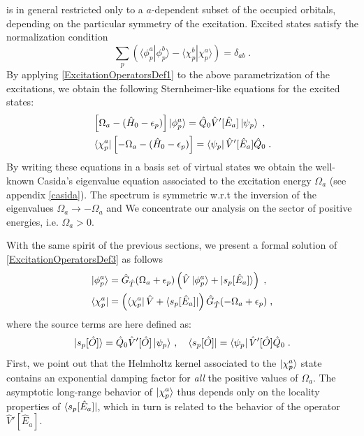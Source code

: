 \documentclass[reprint,aps,prb]{revtex4-1}
\newcommand{\eps}{\epsilon}
\newcommand{\be}{\begin{equation}}
\newcommand{\ee}{\end{equation}}
\newcommand{\nn}{\notag}
\newcommand{\lb}{\label}
\newcommand{\op}[1]{\hat {#1}}
\newcommand{\brket}[2]{\langle  #1 | #2 \rangle} %
\newcommand{\hnot}{\op{H}_0}
\newcommand{\GH}{\op G_{\op T}}
\begin{document}
is in general restricted only to a $a$-dependent subset of the occupied orbitals, depending on the particular symmetry
of the excitation.
Excited states  satisfy the normalization condition
\be\lb{ExcitedStateOrthNormDef1}
\sum_p \left(\brket{\phi_p^a}{\phi_p^b} - \brket{\chi_p^b}{\chi_p^a}\right) = \delta_{ab} \;.
\ee
By applying \eqref{ExcitationOperatorsDef1} to the above parametrization
of the excitations, we obtain the following Sternheimer-like equations for the excited states:
\begin{align}\lb{ExcitationOperatorsDef3}
&\left[\Omega_a-(\hnot - \eps_p)\right] \ket{\phi_p^a} = \op Q_0 \op V'[\op E_a] \ket{\psi_p} \;, \nn\\
&\bra{\chi_p^a}\left[-\Omega_a-(\hnot - \eps_p)\right] = \bra{\psi_p} \op V'[\op E_a] \op Q_0  \;.
\end{align}
By writing these equations in a basis set of virtual states we obtain the well-known Casida's eigenvalue equation\cite{CasidaBook}
associated to the excitation energy $\Omega_a$ (see appendix \ref{casida}).
The spectrum is symmetric w.r.t the inversion of the eigenvalues
$\Omega_a \rightarrow -\Omega_a$ and 
We concentrate our analysis on the sector of positive energies, i.e. $\Omega_a > 0$.

With the same spirit of the previous sections, we present a formal solution of \eqref{ExcitationOperatorsDef3} as follows
\begin{align}
\ket{\phi^a_p} &= \GH(\Omega_a+\eps_p)\left(\op V \ket{\phi^a_p} + \ket{s_p[\op E_a]} \right) \;, \nn \\
\bra {\chi^a_p} &=\left(\bra{\chi^a_p} \op V  + \bra{s_p[\op E_a]}\right)  \GH(-\Omega_a+\eps_p)\;,
\end{align}
where the source terms are here defined as:
\be
 \ket{s_p[\op O]} =  \op Q_0 \op V'[\op O] \ket{\psi_p}\,, \quad
 \bra{s_p[\op O]} =   \bra{\psi_p} \op V'[\op O] \op Q_0 \nn \;.
\ee
First, we point out that the Helmholtz kernel associated to the $\ket{\chi^a_p}$ state
contains an exponential damping factor for \emph{all} the positive values of $\Omega_a$.
The asymptotic long-range behavior of $\ket{\chi^a_p}$ thus depends only on the locality properties of
$\bra{s_p[\op E_a]}$, which in turn is related to the behavior of the operator $\op V'[\op E_a]$.
\end{document}
